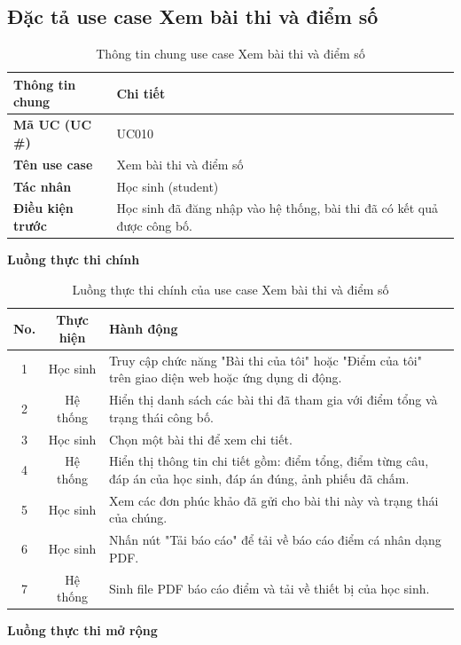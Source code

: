 ﻿\documentclass[../DoAn.tex]{subfiles}
\begin{document}
\subsection{Đặc tả use case Xem bài thi và điểm số}
\label{subsection:appendix:B.4}
\begin{table}[H]
\centering
\begin{tabular}{|p{4cm}|p{10cm}|}
\hline
\textbf{Thông tin chung} & \textbf{Chi tiết} \\ \hline
\textbf{Mã UC (UC \#)} & UC010 \\ \hline
\textbf{Tên use case} & Xem bài thi và điểm số \\ \hline
\textbf{Tác nhân} & Học sinh (student) \\ \hline
\textbf{Điều kiện trước} & Học sinh đã đăng nhập vào hệ thống, bài thi đã có kết quả được công bố. \\ \hline
\end{tabular}
\caption{Thông tin chung use case Xem bài thi và điểm số}
\label{table:appendix:B.4_info}
\end{table}
\noindent\textbf{Luồng thực thi chính}
\begin{table}[H]
\centering
\begin{tabular}{|c|c|p{9cm}|}
\hline
\textbf{No.} & \textbf{Thực hiện} & \textbf{Hành động} \\ \hline
1 & Học sinh & Truy cập chức năng "Bài thi của tôi" hoặc "Điểm của tôi" trên giao diện web hoặc ứng dụng di động. \\ \hline
2 & Hệ thống & Hiển thị danh sách các bài thi đã tham gia với điểm tổng và trạng thái công bố. \\ \hline
3 & Học sinh & Chọn một bài thi để xem chi tiết. \\ \hline
4 & Hệ thống & Hiển thị thông tin chi tiết gồm: điểm tổng, điểm từng câu, đáp án của học sinh, đáp án đúng, ảnh phiếu đã chấm. \\ \hline
5 & Học sinh & Xem các đơn phúc khảo đã gửi cho bài thi này và trạng thái của chúng. \\ \hline
6 & Học sinh & Nhấn nút "Tải báo cáo" để tải về báo cáo điểm cá nhân dạng PDF. \\ \hline
7 & Hệ thống & Sinh file PDF báo cáo điểm và tải về thiết bị của học sinh. \\ \hline
\end{tabular}
\caption{Luồng thực thi chính của use case Xem bài thi và điểm số}
\label{table:appendix:B.4_main}
\end{table}
\noindent\textbf{Luồng thực thi mở rộng}
\end{document}
